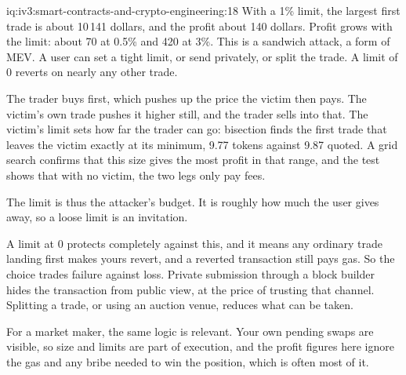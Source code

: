 \begin{solution}{iq:iv3:smart-contracts-and-crypto-engineering:18}
With a 1\% limit, the largest first trade is about 10\,141 dollars, and the profit about 140 dollars. Profit grows with the limit: about 70 at 0.5\% and 420 at 3\%. This is a sandwich attack, a form of MEV. A user can set a tight limit, or send privately, or split the trade. A limit of 0 reverts on nearly any other trade.
\label{lst:iv3:cr:sandwich}

The trader buys first, which pushes up the price the victim then pays. The victim's own trade pushes it higher still, and the trader sells into that. The victim's limit sets how far the trader can go: bisection finds the first trade that leaves the victim exactly at its minimum, 9.77 tokens against 9.87 quoted. A grid search confirms that this size gives the most profit in that range, and the test shows that with no victim, the two legs only pay fees.

The limit is thus the attacker's budget. It is roughly how much the user gives away, so a loose limit is an invitation.

A limit at 0 protects completely against this, and it means any ordinary trade landing first makes yours revert, and a reverted transaction still pays gas. So the choice trades failure against loss. Private submission through a block builder hides the transaction from public view, at the price of trusting that channel. Splitting a trade, or using an auction venue, reduces what can be taken.

For a market maker, the same logic is relevant. Your own pending swaps are visible, so size and limits are part of execution, and the profit figures here ignore the gas and any bribe needed to win the position, which is often most of it.

\end{solution}

